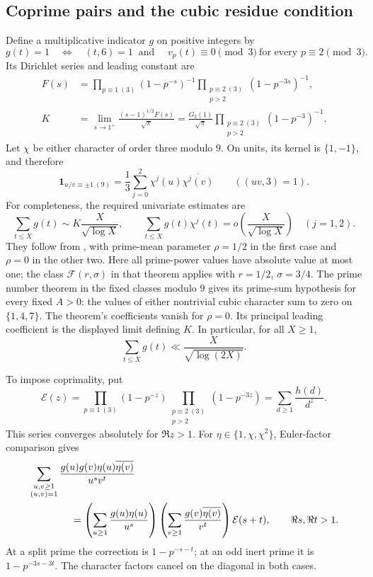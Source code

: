 \subsection{Coprime pairs and the cubic residue condition}

Define a multiplicative indicator \(g\) on positive integers by
\[
 g(t)=1\quad\Longleftrightarrow\quad
 (t,6)=1\ \text{ and }\quad
 v_p(t)\equiv0\pmod3\ \text{for every }p\equiv2\pmod3.
\]
Its Dirichlet series and leading constant are
\begin{align*}
 F(s)&=
 \prod_{p\equiv1\ (3)}(1-p^{-s})^{-1}
 \prod_{\substack{p\equiv2\ (3)\\p>2}}(1-p^{-3s})^{-1},\\
 K&=\lim_{s\to1^+}\frac{(s-1)^{1/2}F(s)}{\sqrt\pi}
   =\frac{G_3(1)}{\sqrt\pi}
     \prod_{\substack{p\equiv2\ (3)\\p>2}}(1-p^{-3})^{-1}.
\end{align*}
Let \(\chi\) be either character of order three modulo \(9\).
On units, its kernel is \(\{1,-1\}\), and therefore
\[
 \mathbf1_{u/v\equiv\pm1\ (9)}
 =\frac13\sum_{j=0}^2\chi^j(u)\overline{\chi^j(v)}
 \qquad ((uv,3)=1).
\]
For completeness, the required univariate estimates are
\begin{equation}\label{eq:rational-sd}
 \sum_{t\le X}g(t)\sim K\frac{X}{\sqrt{\log X}},
 \qquad
 \sum_{t\le X}g(t)\chi^j(t)
 =o\left(\frac{X}{\sqrt{\log X}}\right)\quad(j=1,2).
\end{equation}
They follow from \cite[Theorem~1.2]{BretecheTenenbaum}, with prime-mean
parameter \(\rho=1/2\) in the first case and \(\rho=0\) in the other
two.  Here all prime-power values have absolute value at most one; the
class \(\mathcal F(r,\sigma)\) in that theorem applies with
\(r=1/2\), \(\sigma=3/4\).  The prime number theorem in the fixed
classes modulo \(9\) gives its prime-sum hypothesis for every fixed
\(A>0\): the values of either nontrivial cubic character sum to zero
on \(\{1,4,7\}\).  The theorem's coefficients vanish for \(\rho=0\).
Its principal leading coefficient is the displayed limit defining
\(K\).  In particular, for all \(X\ge1\),
\begin{equation}\label{eq:rational-sd-upper}
 \sum_{t\le X}g(t)\ll\frac{X}{\sqrt{\log(2X)}}.
\end{equation}

To impose coprimality, put
\[
 \mathcal E(z)=
 \prod_{p\equiv1\ (3)}(1-p^{-z})
 \prod_{\substack{p\equiv2\ (3)\\p>2}}(1-p^{-3z})
 =\sum_{d\ge1}\frac{h(d)}{d^z}.
\]
This series converges absolutely for \(\Re z>1\).  For
\(\eta\in\{1,\chi,\chi^2\}\), Euler-factor comparison gives
\begin{align*}
 &\sum_{\substack{u,v\ge1\\(u,v)=1}}
 \frac{g(u)g(v)\eta(u)\overline{\eta(v)}}{u^s v^t}\\
 &\hspace{15mm}=
 \left(\sum_{u\ge1}\frac{g(u)\eta(u)}{u^s}\right)
 \left(\sum_{v\ge1}\frac{g(v)\overline{\eta(v)}}{v^t}\right)
 \mathcal E(s+t),\qquad \Re s,\Re t>1.
\end{align*}
At a split prime the correction is \(1-p^{-s-t}\); at an odd inert
prime it is \(1-p^{-3s-3t}\).  The character factors cancel on the
diagonal in both cases.

